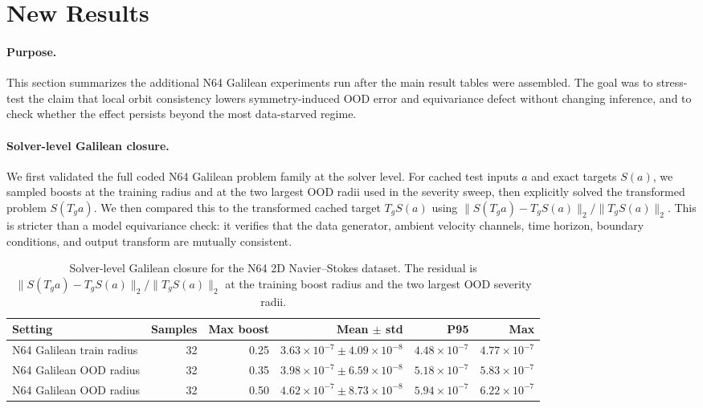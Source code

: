 \section{New Results}
\label{sec:new-results}

\paragraph{Purpose.} This section summarizes the additional N64 Galilean experiments run after the main result tables were assembled. The goal was to stress-test the claim that local orbit consistency lowers symmetry-induced OOD error and equivariance defect without changing inference, and to check whether the effect persists beyond the most data-starved regime.

\paragraph{Solver-level Galilean closure.} We first validated the full coded N64 Galilean problem family at the solver level. For cached test inputs \(a\) and exact targets \(S(a)\), we sampled boosts at the training radius and at the two largest OOD radii used in the severity sweep, then explicitly solved the transformed problem \(S(T_g a)\). We then compared this to the transformed cached target \(T_gS(a)\) using \(\|S(T_g a)-T_gS(a)\|_2/\|T_gS(a)\|_2\). This is stricter than a model equivariance check: it verifies that the data generator, ambient velocity channels, time horizon, boundary conditions, and output transform are mutually consistent.

\begin{table}[t]
\centering
\small
\caption{Solver-level Galilean closure for the N64 2D Navier--Stokes dataset. The residual is \(\|S(T_g a)-T_gS(a)\|_2/\|T_gS(a)\|_2\) at the training boost radius and the two largest OOD severity radii.}
\label{tab:new-n64-solver-closure}
\begin{tabular}{lrrrrr}
\toprule
Setting & Samples & Max boost & Mean \(\pm\) std & P95 & Max \\
\midrule
N64 Galilean train radius & 32 & 0.25 & \(3.63\times10^{-7}\pm4.09\times10^{-8}\) & \(4.48\times10^{-7}\) & \(4.77\times10^{-7}\) \\
N64 Galilean OOD radius & 32 & 0.35 & \(3.98\times10^{-7}\pm6.59\times10^{-8}\) & \(5.18\times10^{-7}\) & \(5.83\times10^{-7}\) \\
N64 Galilean OOD radius & 32 & 0.50 & \(4.62\times10^{-7}\pm8.73\times10^{-8}\) & \(5.94\times10^{-7}\) & \(6.22\times10^{-7}\) \\
\bottomrule
\end{tabular}
\end{table}

